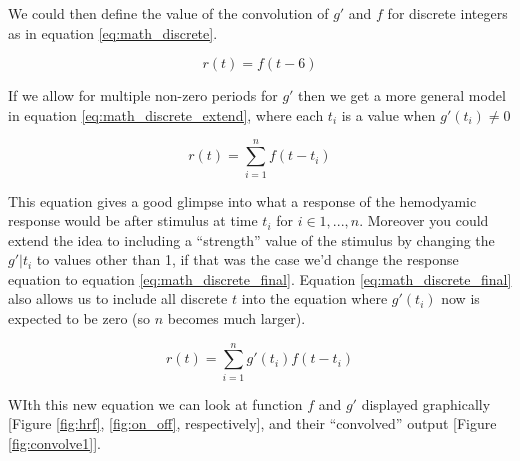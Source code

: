\documentclass[11pt]{article}
\begin{document}
We could then define the value of the convolution of $g'$ and $f$ for discrete integers as in equation \ref{eq:math_discrete}.


\begin{equation}  \label{eq:math_discrete}
r(t)=  f(t-6)
\end{equation}



If we allow for multiple non-zero periods for $g'$ then we get a more general model in equation \ref{eq:math_discrete_extend}, where each $t_i$ is a value when $g'(t_i) \neq 0$

\begin{equation}  \label{eq:math_discrete_extend}
r(t)= \sum_{i=1}^n f(t-t_i)
\end{equation}

This equation gives a good glimpse into what a response of the hemodyamic response would be after stimulus at time $t_i$ for $i \in {1,...,n}$. Moreover you could extend the idea to including a ``strength'' value of the stimulus by changing the $g'|t_i$ to values other than 1, if that was the case we'd change the response equation to equation \ref{eq:math_discrete_final}. Equation \ref{eq:math_discrete_final} also allows us to include all discrete $t$ into the equation where $g'(t_i)$ now is expected to be zero (so $n$ becomes much larger). 

\begin{equation}  \label{eq:math_discrete_final}
r(t)= \sum_{i=1}^n g'(t_i) f(t-t_i)
\end{equation}


WIth this new equation we can look at function $f$ and $g'$ displayed graphically [Figure \ref{fig:hrf}, \ref{fig:on_off}, respectively], and their ``convolved'' output [Figure \ref{fig:convolve1}].
\end{document}
